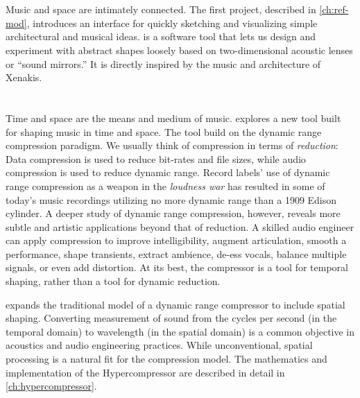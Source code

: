 \section{}
\label{sec:refmod-intro}
Music and space are intimately connected. The first
project, described in \autoref{ch:ref-mod}, introduces an interface
for quickly sketching and visualizing simple architectural and musical
ideas.  is a software tool that lets us design and experiment
with abstract shapes loosely based on two-dimensional acoustic lenses
or ``sound mirrors.'' It is directly inspired by the music and
architecture of Xenakis.

\section{\thesis}
\label{sec:hypercompression-intro}
Time and space are the means and medium of music. \thesis
explores a new tool built for shaping music in time and space. The
tool build on the dynamic range compression paradigm.  We usually
think of compression in terms of \emph{reduction}: Data compression is
used to reduce bit-rates and file sizes, while audio compression is
used to reduce dynamic range. Record labels' use of dynamic range
compression as a weapon in the \emph{loudness
  war}\cite{Deruty2014a} has resulted in some of today's music
recordings utilizing no more dynamic range than a 1909 Edison
cylinder.\cite{Katz2007} A deeper study of dynamic range compression,
however, reveals more subtle and artistic applications beyond that of
reduction. A skilled audio engineer can apply compression to improve
intelligibility, augment articulation, smooth a performance, shape
transients, extract ambience, de-ess vocals, balance multiple signals,
or even add distortion.\cite{Case2007} At its best, the compressor is
a tool for temporal shaping, rather than a tool for dynamic reduction.

\thesis expands the traditional model of a dynamic range compressor to
include spatial shaping.  Converting measurement of sound from the
cycles per second (in the temporal domain) to wavelength (in the
spatial domain) is a common objective in acoustics and audio
engineering practices.\cite{Davis1989} While unconventional, spatial
processing is a natural fit for the compression model. The mathematics
and implementation of the Hypercompressor are described in detail in
\autoref{ch:hypercompressor}.


